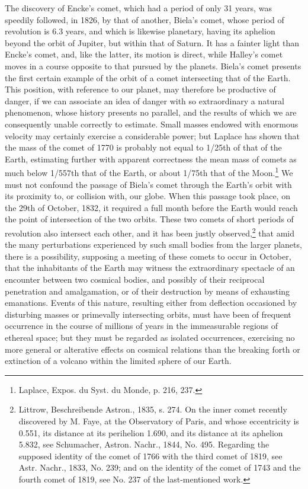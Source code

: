 The discovery of Encke's comet, which had a period of only 31 years, was speedily followed, in 1826, by that of another, Biela's comet, whose period of revolution is 6.3 years, and which is likewise planetary, having its aphelion beyond the orbit of Jupiter, but within that of Saturn. It has a fainter light than Encke's comet, and, like the latter, its motion is direct, while Halley's comet moves in a course opposite to that pursued by the planets. Biela's comet presents the first certain example of the orbit of a comet intersecting that of the Earth. This position, with reference to our planet, may therefore be productive of danger, if we can associate an idea of danger with so extraordinary a natural phenomenon, whose history presents no parallel, and the results of which we are consequently unable correctly to estimate. Small masses endowed with enormous velocity may certainly exercise a considerable power; but Laplace has shown that the mass of the comet of 1770 is probably not equal to 1/25th of that of the Earth, estimating further with apparent correctness the mean mass of comets as much below 1/557th that of the Earth, or about 1/75th that of the Moon.\footnote{Laplace, Expos. du Syst. du Monde, p. 216, 237.} We must not confound the passage of Biela's comet through the Earth's orbit with its proximity to, or collision with, our globe. When this passage took place, on the 29th of October, 1832, it required a full month before the Earth would reach the point of intersection of the two orbits. These two comets of short periods of revolution also intersect each other, and it has been justly observed,\footnote{Littrow, Beschreibende Astron., 1835, s. 274. On the inner comet recently discovered by M. Faye, at the Observatory of Paris, and whose eccentricity is 0.551, its distance at its perihelion 1.690, and its distance at its aphelion 5.832, see Schumacher, Astron. Nachr., 1844, No. 495. Regarding the supposed identity of the comet of 1766 with the third comet of 1819, see Astr. Nachr., 1833, No. 239; and on the identity of the comet of 1743 and the fourth comet of 1819, see No. 237 of the last-mentioned work.} that amid the many perturbations experienced by such small bodies from the larger planets, there is a possibility, supposing a meeting of these comets to occur in October, that the inhabitants of the Earth may witness the extraordinary spectacle of an encounter between two cosmical bodies, and possibly of their reciprocal penetration and amalgamation, or of their destruction by means of exhausting emanations. Events of this nature, resulting either from deflection occasioned by disturbing masses or primevally intersecting orbits, must have been of frequent occurrence in the course of millions of years in the immeasurable regions of ethereal space; but they must be regarded as isolated occurrences, exercising no more general or alterative effects on cosmical relations than the breaking forth or extinction of a volcano within the limited sphere of our Earth.

